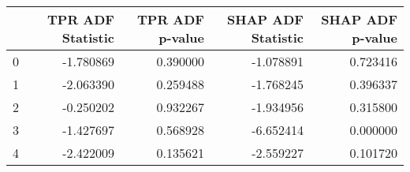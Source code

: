 \begin{tabular}{lrrrr}
\toprule
 & TPR ADF Statistic & TPR ADF p-value & SHAP ADF Statistic & SHAP ADF p-value \\
\midrule
0 & -1.780869 & 0.390000 & -1.078891 & 0.723416 \\
1 & -2.063390 & 0.259488 & -1.768245 & 0.396337 \\
2 & -0.250202 & 0.932267 & -1.934956 & 0.315800 \\
3 & -1.427697 & 0.568928 & -6.652414 & 0.000000 \\
4 & -2.422009 & 0.135621 & -2.559227 & 0.101720 \\
\bottomrule
\end{tabular}
